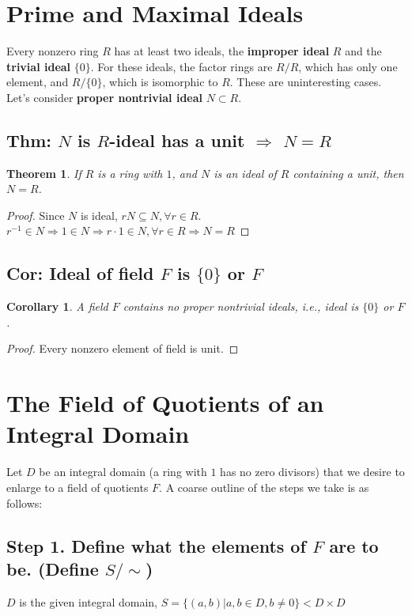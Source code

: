 \documentclass[11pt,a4paper]{article}
\newtheorem{theorem}{Theorem}
\newtheorem{corollary}{Corollary}
\begin{document}
\section{Prime and Maximal Ideals}
Every nonzero ring $R$ has at least two ideals, the \textbf{improper ideal} $R$ and the \textbf{trivial ideal} $\{0\}$. For these ideals, the factor rings are $R/R$, which has only one element, and $R/\{0\}$, which is isomorphic to $R$. These are uninteresting cases. Let's consider \textbf{proper nontrivial ideal} $N\subset R$.

\subsection{Thm: $N$ is $R$-ideal has a unit $\Rightarrow$ $N=R$}
\begin{theorem}
    If $R$ is a ring with $1$, and $N$ is an ideal of $R$ containing a unit, then $N = R$.
\end{theorem}
\begin{proof}
    Since $N$ is ideal, $rN\subseteq N,\forall r\in R$. $r^{-1}\in N \Rightarrow 1\in N \Rightarrow	r\cdot 1\in N, \forall r\in R \Rightarrow N=R$
\end{proof}

\subsection{Cor: Ideal of field $F$ is $\{0\}$ or $F$}
\begin{corollary}
    A field $F$ contains no proper nontrivial ideals, i.e., ideal is $\{0\}$ or $F$.
\end{corollary}
\begin{proof}
    Every nonzero element of field is unit.
\end{proof}








\section{The Field of Quotients of an Integral Domain}
Let $D$ be an integral domain (a ring with $1$ has no zero divisors) that we desire to enlarge to a field of quotients $F$. A coarse
outline of the steps we take is as follows:

\subsection{Step 1. Define what the elements of $F$ are to be. (Define $S/\sim$)}
$D$ is the given integral domain, $S=\{(a,b)|a,b\in D,b\neq 0\}<D\times D$
\end{document}
